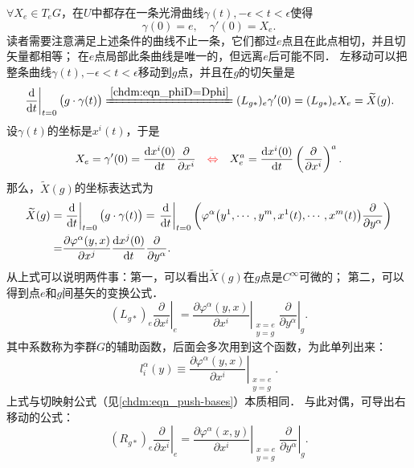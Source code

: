 $\forall X_e \in T_eG$，在$U$中都存在一条光滑曲线$\gamma(t),-\epsilon < t < \epsilon$使得
\begin{equation}
    \gamma(0)=e,\quad \gamma'(0)=X_e .
\end{equation}
读者需要注意满足上述条件的曲线不止一条，它们都过$e$点且在此点相切，并且切矢量都相等；
在$e$点局部此条曲线是唯一的，但远离$e$后可能不同．
左移动可以把整条曲线$\gamma(t),-\epsilon < t < \epsilon$移动到$g$点，并且在$g$的切矢量是
\begin{equation}\label{chlg:eqn_tmpl10}
    \left. \frac{\rm d}{{\rm d}t} \right|_{t=0} \bigl(g\cdot \gamma(t) \bigr)
    \xlongequal{\ref{chdm:eqn_phiD=Dphi}} (L_{g*})_e \gamma'(0) = (L_{g*})_e X_e  = \widetilde{X}(g) .
\end{equation}
设$\gamma(t)$的坐标是$x^i(t)$，于是
\begin{equation}
    X_e =\gamma'(0)= \frac{{\rm d} x^i(0)}{{\rm d}t} \frac{\partial }{\partial x^i}
    \quad {\color{red}\Leftrightarrow} \quad
    X^a_e = \frac{{\rm d} x^i(0)}{{\rm d}t} \left(\frac{\partial }{\partial x^i}\right)^a .
\end{equation}
那么，$\widetilde{X}(g)$的坐标表达式为
\begin{align*}
    \widetilde{X}(g)=& \left. \frac{\rm d}{{\rm d}t} \right|_{t=0} \bigl(g\cdot \gamma(t) \bigr)
      =\left. \frac{\rm d}{{\rm d}t} \right|_{t=0} \left( \varphi^\alpha \bigl(y^1,\cdots,y^m, 
      x^1(t),\cdots,x^m(t) \bigr)  \frac{\partial}{\partial y^\alpha} \right) \\
    =& \frac{\partial \varphi^\alpha (y,x)}{\partial x^j} \frac{{\rm d} x^j(0)}{{\rm d}t} 
      \frac{\partial}{\partial y^\alpha} .
\end{align*}
从上式可以说明两件事：第一，可以看出$\widetilde{X}(g)$在$g$点是$C^\infty$可微的；
第二，可以得到点$e$和$g$间基矢的变换公式．
\begin{equation}\label{chlg:eqn_lve}
    (L_{g*})_e\left. \frac{\partial }{\partial x^i }\right|_{e}
    = \left. \frac{\partial \varphi^\alpha (y,x)}{\partial x^i} 
    \right|_{\substack{x=e\\y=g}}   \left. \frac{\partial}{\partial y^\alpha}\right|_{g} .
\end{equation}
其中系数称为李群$G$的{\heiti 辅助函数}，后面会多次用到这个函数，为此单列出来：
\begin{equation}\label{chlg:eqn_auxiliaryfun}
    l^\alpha_i(y)\equiv \left. \frac{\partial \varphi^\alpha (y,x)}
     {\partial x^i}\right|_{\substack{x=e\\y=g}}.
\end{equation} 
上式与切映射公式（见\eqref{chdm:eqn_push-bases}）本质相同．
与此对偶，可导出右移动的公式： %
\begin{equation}\label{chlg:eqn_rve}
    (R_{g*})_e \left. \frac{\partial }{\partial x^i }\right|_{e}
     = \left. \frac{\partial \varphi^\alpha (x,y)}{\partial x^i} 
    \right|_{\substack{x=e\\y=g}}   \left. \frac{\partial}{\partial y^\alpha}\right|_{g} .
\end{equation}


